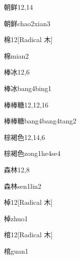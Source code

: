 \begin{entry}{朝鲜}{12,14}
  \begin{phonetics}{朝鲜}{chao2xian3}
  \end{phonetics}
\end{entry}

\begin{entry}{棉}{12}[Radical 木]
  \begin{phonetics}{棉}{mian2}
  \end{phonetics}
\end{entry}

\begin{entry}{棒冰}{12,6}
  \begin{phonetics}{棒冰}{bang4bing1}
  \end{phonetics}
\end{entry}

\begin{entry}{棒棒糖}{12,12,16}
  \begin{phonetics}{棒棒糖}{bang4bang4tang2}
  \end{phonetics}
\end{entry}

\begin{entry}{棕褐色}{12,14,6}
  \begin{phonetics}{棕褐色}{zong1he4se4}
  \end{phonetics}
\end{entry}

\begin{entry}{森林}{12,8}
  \begin{phonetics}{森林}{sen1lin2}
  \end{phonetics}
\end{entry}

\begin{entry}{棹}{12}[Radical 木]
  \begin{phonetics}{棹}{zhuo1}
  \end{phonetics}
\end{entry}

\begin{entry}{棺}{12}[Radical ⽊]
  \begin{phonetics}{棺}{guan1}
  \end{phonetics}
\end{entry}

